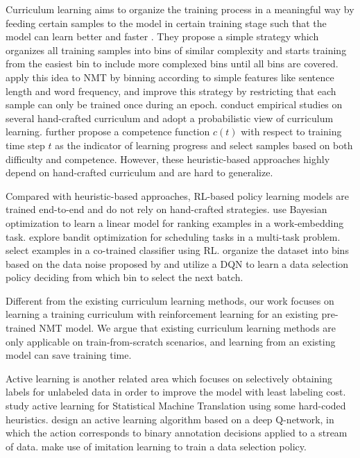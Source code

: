 \documentclass[letterpaper]{article}
\begin{document}
Curriculum learning aims to organize the training process in a meaningful way by feeding certain samples to the model in certain training stage such that the model can learn better and faster \cite{bengio2009curriculum}. They propose a simple strategy which organizes all training samples into bins of similar complexity and starts training from the easiest bin to include more complexed bins until all bins are covered. \cite{kocmi2017curriculum} apply this idea to NMT by binning according to simple features like sentence length and word frequency, and improve this strategy by restricting that each sample can only be trained once during an epoch. \cite{zhang2018empirical} conduct empirical studies on several hand-crafted curriculum and adopt a probabilistic view of curriculum learning. \cite{platanios2019competence} further propose a competence function $c(t)$ with respect to training time step $t$ as the indicator of learning progress and select samples based on both difficulty and competence. However, these heuristic-based approaches highly depend on hand-crafted curriculum and are hard to generalize.

Compared with heuristic-based approaches, RL-based policy learning models are trained end-to-end and do not rely on hand-crafted strategies. \cite{tsvetkov2016learning} use Bayesian optimization to learn a linear model for ranking examples in a work-embedding task. \cite{graves2017automated} explore bandit optimization for scheduling tasks in a multi-task problem.\cite{wu2018reinforced} select examples in a co-trained classifier using RL. \cite{kumar2019reinforcement} organize the dataset into bins based on the data noise proposed by \cite{wang2018denoising} and utilize a DQN to learn a data selection policy deciding from which bin to select the next batch. 

Different from the existing curriculum learning methods, our work focuses on learning a training curriculum with reinforcement learning for an existing pre-trained NMT model. We argue that existing curriculum learning methods are only applicable on train-from-scratch scenarios, and learning from an existing model can save training time.

Active learning \cite{settles2009active} is another related area which focuses on selectively obtaining labels for unlabeled data in order to improve the model with least labeling cost. \cite{haffari2009active} \cite{bloodgood2010bucking} study active learning for Statistical Machine Translation using some hard-coded heuristics. \cite{fang2017learning} design an active learning algorithm based on a deep Q-network, in which the action corresponds to binary annotation decisions applied to a stream of data. \cite{liu2018learning} make use of imitation learning to train a data selection policy.
\end{document}
